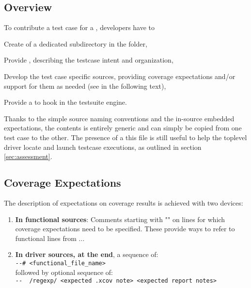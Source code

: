 \documentclass {report}
\begin{document}
\subsection{Overview}

To contribute a test case for a \tor{}, developers have to

\begin{Itemize}
\item%
  Create of a dedicated subdirectory in the \tor{} folder,
%
\item%
  Provide , describing the testcase intent and organization,
%
\item%
  Develop the test case specific sources, providing coverage expectations
  and/or support for them as needed (see in the following text),
%
\item%
  Provide a  to hook in the testsuite engine.
%
\end{Itemize}

Thanks to the simple source naming conventions and the in-source embedded
expectations, the  contents is entirely generic and can simply be
copied from one test case to the other.
%
The presence of a this file is still useful to help the toplevel driver locate
and launch testcase executions, as outlined in section \ref{sec:assessment}.

\subsection{Coverage Expectations}

The description of expectations on coverage results is achieved with two
devices:

\begin{enumerate}
\item \textbf{In functional sources}:
  Comments starting with "\T{-{}- \#}" on lines for which coverage
  expectations need to be specified. These provide ways to refer
  to functional lines from ...

\item \textbf{In driver sources, at the end}, a sequence of:\\

  \verb|--# <functional_file_name>|\\

  followed by optional sequence of:\\

  \verb|--  /regexp/ <expected .xcov note> <expected report notes>|\\
\end{enumerate}
\end{document}
